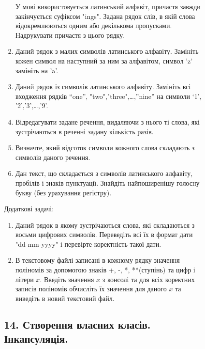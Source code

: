 \documentclass[]{article}
\makeatletter
\newcommand{\xslalph}[1]{\expandafter\@xslalph\csname c@#1\endcsname}
\newcommand{\@xslalph}[1]{%
    \ifcase#1\or а\or б\or в\or г\or д\or e\or є\or ж\or з\or i%
    \or й\or к\or л\or м\or н\or о\or п\or р\or с\or т%
    \or у\or ф\or х\or ц\or ч\or ш\or ю\or я\or аа\or бб\or вв%
    \else\@ctrerr\fi%
}
\makeatother
\begin{document}
\begin{enumerate}
\begin{enumerate}[label=\xslalph*)]
\begin{enumerate}
\begin{enumerate}[label=\xslalph*)]
\begin{enumerate}
  У мові використовується латинський алфавіт, причастя завжди
  закінчується суфіксом "ings". Задана рядок слів, в якій слова
  відокремлюються одним або декількома пропусками. Надрукувати причастя
  з цього рядку.
\item
  Даний рядок з малих символів латинського алфавіту. Замініть кожен
  символ на наступний за ним за алфавітом, символ 'z' замініть на 'a'.
\item
  Даний рядок із символів латинського алфавіту. Замініть всі входження
  рядків ``one'', "two","three",\ldots{},''nine'' на символи `1',
  '2','3',\ldots{},'9'.
\item
  Відредагувати задане речення, видаляючи з нього ті слова, які
  зустрічаються в реченні задану кількість разів.
\item
  Визначте, який відсоток символи кожного слова складають з символів
  даного речення.
\item
  Дан текст, що складається з символів латинського алфавіту, пробілів і
  знаків пунктуації. Знайдіть найпоширенішу голосну букву (без
  урахування регістру).

\end{enumerate}

Додаткові задачі:

\begin{enumerate}
\def\labelenumi{\arabic{enumi})}
\setcounter{enumi}{27}
\item
  Даний рядок в якому зустрічаються слова, які складаються з восьми
  цифрових символів. Переведіть всі їх в формат дати "dd-mm-yyyy" і
  перевірте коректність такої дати.
\item
  В текстовому файлі записані в кожному рядку значення поліномів за
  допомогою знаків +, -, *, **(ступінь) та цифр і літери $x$. Введіть
  значення $x$ з консолі та для всіх коректних записів поліномів обчисліть
  їх значення для даного $x$ та виведіть в новий текстовий файл.
\end{enumerate}


\newpage
\subsection{14. Створення власних класів. Інкапсуляція.}
\setcounter{subsection}{1}



\end{enumerate}
\end{enumerate}
\end{enumerate}
\end{enumerate}
\end{document}
